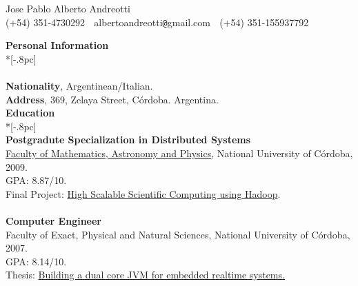 \documentclass[letter,11pt,english]{article}
\begin{document}
\pagestyle{headings}
\setcounter{page}{1}
\begin{center}
{\Large Jose Pablo Alberto Andreotti} \\[.5pc]
(+54) 351-4730292 $\;$ albertoandreotti\verb|@|gmail.com $\;$ (+54) 351-155937792 \\[3pc]
\end{center}
{\large \bf Personal Information} \\*[-.8pc]
\underline{\hspace{6in}} \\
\\
{\bf Nationality}, Argentinean/Italian.\\
{\bf Address}, 369, Zelaya Street, C\'ordoba. Argentina.\\

{\large \bf Education} \\*[-.8pc]
\underline{\hspace{6in}} \\
{\bf Postgradute Specialization in Distributed Systems}\\
\href{http://www.famaf.unc.edu.ar/}{Faculty of Mathematics, Astronomy and Physics}, National University of C\'ordoba, 2009. \\
GPA: 8.87/10. \\
Final Project: \href{https://docs.google.com/viewer?a=v&pid=explorer&chrome=true&srcid=0B5AOpwg8IzVANjJlODZhZDctNWUzMS00MmNhLWI3OWMtMWNhMTdjODQwNjVl&hl=en}{High Scalable Scientific Computing using Hadoop}.\\
\\
{\bf Computer Engineer}\\
Faculty of Exact, Physical and Natural Sciences, National University of C\'ordoba, 2007.\\
GPA: 8.14/10. \\
Thesis: \href{https://docs.google.com/viewer?a=v&pid=explorer&chrome=true&srcid=1gdJXYgQtLDHDOxGDtbKzdmAl1LmNx-yo4w6vNl-K_Z-1YocLhtJxMvoqGvd1&hl=en}{Building a dual core JVM for embedded realtime systems.}\\
\end{document}
